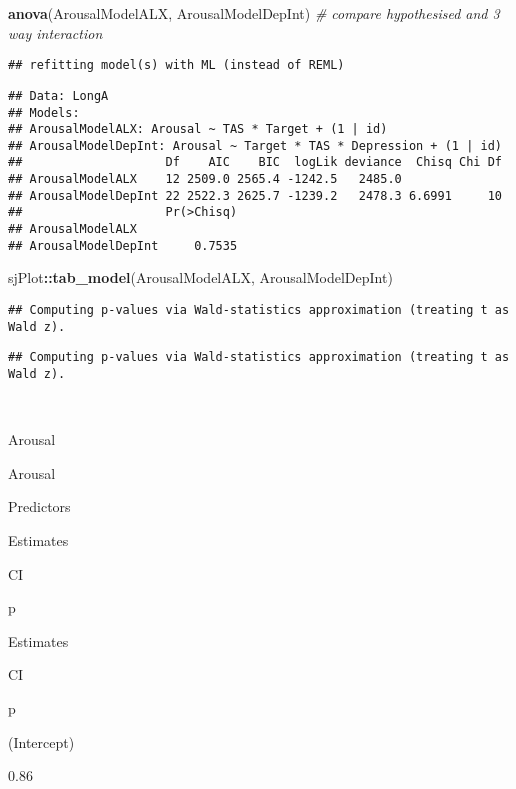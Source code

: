 \documentclass[]{article}
\newenvironment{Shaded}{\begin{snugshade}}{\end{snugshade}}
\newcommand{\CommentTok}[1]{\textcolor[rgb]{0.56,0.35,0.01}{\textit{#1}}}
\newcommand{\KeywordTok}[1]{\textcolor[rgb]{0.13,0.29,0.53}{\textbf{#1}}}
\newcommand{\NormalTok}[1]{#1}
\newcommand{\OperatorTok}[1]{\textcolor[rgb]{0.81,0.36,0.00}{\textbf{#1}}}
\begin{document}
\begin{Shaded}
\begin{Highlighting}[]
\KeywordTok{anova}\NormalTok{(ArousalModelALX, ArousalModelDepInt) }\CommentTok{# compare hypothesised and 3 way interaction}
\end{Highlighting}
\end{Shaded}

\begin{verbatim}
## refitting model(s) with ML (instead of REML)
\end{verbatim}

\begin{verbatim}
## Data: LongA
## Models:
## ArousalModelALX: Arousal ~ TAS * Target + (1 | id)
## ArousalModelDepInt: Arousal ~ Target * TAS * Depression + (1 | id)
##                    Df    AIC    BIC  logLik deviance  Chisq Chi Df
## ArousalModelALX    12 2509.0 2565.4 -1242.5   2485.0              
## ArousalModelDepInt 22 2522.3 2625.7 -1239.2   2478.3 6.6991     10
##                    Pr(>Chisq)
## ArousalModelALX              
## ArousalModelDepInt     0.7535
\end{verbatim}

\begin{Shaded}
\begin{Highlighting}[]
\NormalTok{sjPlot}\OperatorTok{::}\KeywordTok{tab_model}\NormalTok{(ArousalModelALX, ArousalModelDepInt) }
\end{Highlighting}
\end{Shaded}

\begin{verbatim}
## Computing p-values via Wald-statistics approximation (treating t as Wald z).
\end{verbatim}

\begin{verbatim}
## Computing p-values via Wald-statistics approximation (treating t as Wald z).
\end{verbatim}

~

Arousal

Arousal

Predictors

Estimates

CI

p

Estimates

CI

p

(Intercept)

0.86
\end{document}
